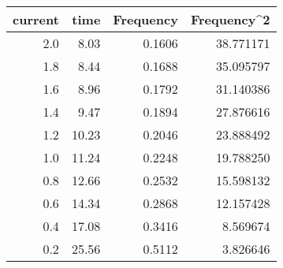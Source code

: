 \begin{table}[H]
\centering
\label{date_raw}
\begin{tabular}{rrrr}
\toprule
 current &  time &  Frequency &  Frequency\textasciicircum 2 \\
\midrule
     2.0 &  8.03 &     0.1606 &    38.771171 \\
     1.8 &  8.44 &     0.1688 &    35.095797 \\
     1.6 &  8.96 &     0.1792 &    31.140386 \\
     1.4 &  9.47 &     0.1894 &    27.876616 \\
     1.2 & 10.23 &     0.2046 &    23.888492 \\
     1.0 & 11.24 &     0.2248 &    19.788250 \\
     0.8 & 12.66 &     0.2532 &    15.598132 \\
     0.6 & 14.34 &     0.2868 &    12.157428 \\
     0.4 & 17.08 &     0.3416 &     8.569674 \\
     0.2 & 25.56 &     0.5112 &     3.826646 \\
\bottomrule
\end{tabular}
\end{table}
